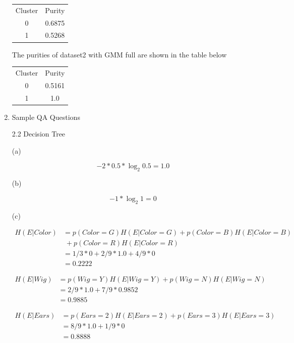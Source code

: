 \documentclass[11pt]{article}
\begin{document}
\begin{enumerate}
\begin{center}
  \begin{tabular}{ |c|c| }
   \hline
   Cluster & Purity \\
   0 & 0.6875 \\
   1 & 0.5268 \\
   \hline
  \end{tabular}
\end{center}

The purities of dataset2 with GMM full are shown in the table below

\begin{center}
  \begin{tabular}{ |c|c| }
   \hline
   Cluster & Purity \\
   0 & 0.5161 \\
   1 & 1.0 \\
   \hline
  \end{tabular}
\end{center}

\item
Sample QA Questions

\medskip

2.2 Decision Tree

\medskip

(a)

$$
-2 * 0.5 * \log_{2}{0.5} = 1.0
$$

\medskip

(b)

$$
- 1 * \log_{2}{1} = 0
$$

\medskip

(c)

$$\begin{aligned}
  H(E|Color) &= p(Color=G)H(E|Color=G) + p(Color=B)H(E|Color=B)\\
  &\; + p(Color=R)H(E|Color=R) \\
  &= 1/3 * 0 + 2/9 * 1.0 + 4/9 * 0 \\
  &= 0.2222
\end{aligned}$$

$$\begin{aligned}
H(E|Wig) &= p(Wig=Y)H(E|Wig=Y) + p(Wig=N)H(E|Wig=N) \\
&= 2/9 * 1.0 + 7/9 * 0.9852 \\
&= 0.9885
\end{aligned}$$

$$\begin{aligned}
  H(E|Ears) &= p(Ears=2)H(E|Ears=2) + p(Ears=3)H(E|Ears=3) \\
  &= 8/9 * 1.0 + 1/9 * 0 \\
  &= 0.8888
\end{aligned}$$


\end{enumerate}
\end{document}
